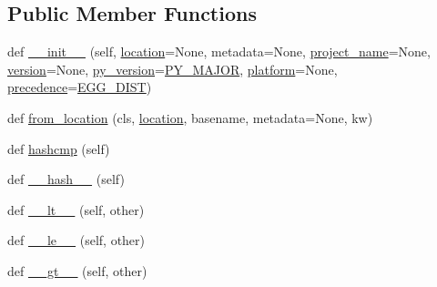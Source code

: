 \subsection*{Public Member Functions}
\begin{DoxyCompactItemize}
\item 
def \hyperlink{classpip_1_1__vendor_1_1pkg__resources_1_1Distribution_acc88f1c6cf64526416b99b70c5bb0bd5}{\+\_\+\+\_\+init\+\_\+\+\_\+} (self, \hyperlink{classpip_1_1__vendor_1_1pkg__resources_1_1Distribution_affb4f9c968acd530b5f4abc9af8ddd8d}{location}=None, metadata=None, \hyperlink{classpip_1_1__vendor_1_1pkg__resources_1_1Distribution_a30fef0754544a369e2128dd2352aa9ea}{project\+\_\+name}=None, \hyperlink{classpip_1_1__vendor_1_1pkg__resources_1_1Distribution_acd94a7f669ee4fc277245673ea39e748}{version}=None, \hyperlink{classpip_1_1__vendor_1_1pkg__resources_1_1Distribution_a381f168e72cef0cc74b72287a26c699b}{py\+\_\+version}=\hyperlink{namespacepip_1_1__vendor_1_1pkg__resources_acca7e38274a92063eabc8c2b739d5ca4}{P\+Y\+\_\+\+M\+A\+J\+OR}, \hyperlink{classpip_1_1__vendor_1_1pkg__resources_1_1Distribution_a5d03a7cf6aaaa05c79406f87646d830c}{platform}=None, \hyperlink{classpip_1_1__vendor_1_1pkg__resources_1_1Distribution_ae9dbb44a7b380ab090ed6a8d44d0a47a}{precedence}=\hyperlink{namespacepip_1_1__vendor_1_1pkg__resources_a2d337406bae844cdf2c7ed99345eb6b3}{E\+G\+G\+\_\+\+D\+I\+ST})
\item 
def \hyperlink{classpip_1_1__vendor_1_1pkg__resources_1_1Distribution_a8c888b8790441a5aac08844f0cca4cfc}{from\+\_\+location} (cls, \hyperlink{classpip_1_1__vendor_1_1pkg__resources_1_1Distribution_affb4f9c968acd530b5f4abc9af8ddd8d}{location}, basename, metadata=None, kw)
\item 
def \hyperlink{classpip_1_1__vendor_1_1pkg__resources_1_1Distribution_a9b4a9bc95f5195df95b3f3a7e49c05c1}{hashcmp} (self)
\item 
def \hyperlink{classpip_1_1__vendor_1_1pkg__resources_1_1Distribution_a7b3f9ff03de635ea05f25342d2c946e4}{\+\_\+\+\_\+hash\+\_\+\+\_\+} (self)
\item 
def \hyperlink{classpip_1_1__vendor_1_1pkg__resources_1_1Distribution_a3a94f0ec48b6f18811bed1b54768b2d8}{\+\_\+\+\_\+lt\+\_\+\+\_\+} (self, other)
\item 
def \hyperlink{classpip_1_1__vendor_1_1pkg__resources_1_1Distribution_a88894bd303e8ec6ed4cd9208e06fdf3f}{\+\_\+\+\_\+le\+\_\+\+\_\+} (self, other)
\item 
def \hyperlink{classpip_1_1__vendor_1_1pkg__resources_1_1Distribution_aa3ec0f3aec3a3a2e77597cca06433bfa}{\+\_\+\+\_\+gt\+\_\+\+\_\+} (self, other)

\end{DoxyCompactItemize}
